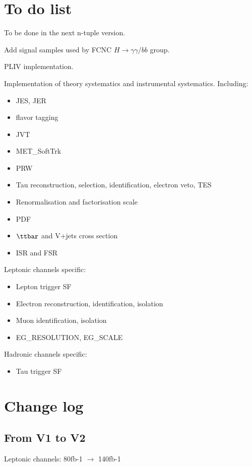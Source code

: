 \section{To do list}

To be done in the next n-tuple version.

Add signal samples used by FCNC $H\to \gamma\gamma/bb$ group.

PLIV implementation.

Implementation of theory systematics and instrumental systematics. Including:

\begin{itemize}
	\item JES, JER
	\item flavor tagging
	\item JVT
	\item MET\_SoftTrk
	\item PRW
	\item Tau reconstruction, selection, identification, electron veto, TES
	\item Renormalisation and factorisation scale
	\item PDF
	\item $\ttbar$ and V+jets cross section
	\item ISR and FSR
\end{itemize}

Leptonic channels specific:
\begin{itemize}
	\item Lepton trigger SF
	\item Electron reconstruction, identification, isolation
	\item Muon identification, isolation
	\item EG\_RESOLUTION, EG\_SCALE
\end{itemize}

Hadronic channels specific:
\begin{itemize}
	\item Tau trigger SF
\end{itemize}

\section{Change log}

\subsection{From V1 to V2}

Leptonic channels:  80fb-1 $\to$ 140fb-1

